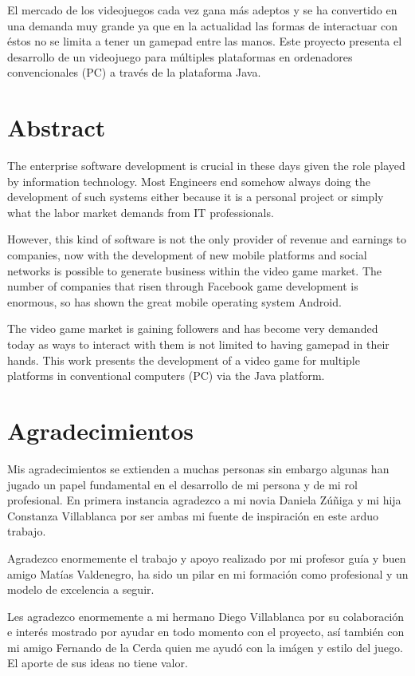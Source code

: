 \documentclass[a4paper,12pt,openany,oneside]{book}
\begin{document}
El mercado de los videojuegos cada vez gana más adeptos y se ha convertido en una demanda muy grande ya que en la actualidad las formas de interactuar con éstos no se limita a tener un gamepad entre las manos. Este proyecto presenta el desarrollo de un videojuego para múltiples plataformas en ordenadores convencionales (PC) a través de la plataforma Java.
\chapter*{Abstract}
\thispagestyle{empty}
The enterprise software development is crucial in these days given the role played by information technology. Most Engineers end somehow always doing the development of such systems either because it is a personal project or simply what the labor market demands from IT professionals.

However, this kind of software is not the only provider of revenue and earnings to companies, now with the development of new mobile platforms and social networks is possible to generate business within the video game market. The number of companies that risen through Facebook game development is enormous, so has shown the great mobile operating system Android.

The video game market is gaining followers and has become very demanded today as ways to interact with them is not limited to having gamepad in their hands. This work presents the development of a video game for multiple platforms in conventional computers (PC) via the Java platform.
\chapter*{Agradecimientos}
\thispagestyle{empty}
Mis agradecimientos se extienden a muchas personas sin embargo algunas han jugado un papel fundamental en el desarrollo de mi persona y de mi rol profesional. En primera instancia agradezco a mi novia Daniela Zúñiga y mi hija Constanza Villablanca por ser ambas mi fuente de inspiración en este arduo trabajo.

Agradezco enormemente el trabajo y apoyo realizado por mi profesor guía y buen amigo Matías Valdenegro, ha sido un pilar en mi formación como profesional y un modelo de excelencia a seguir.

Les agradezco enormemente a mi hermano Diego Villablanca por su colaboración e interés mostrado por ayudar en todo momento con el proyecto, así también con mi amigo Fernando de la Cerda quien me ayudó con la imágen y estilo del juego. El aporte de sus ideas no tiene valor.
\end{document}

